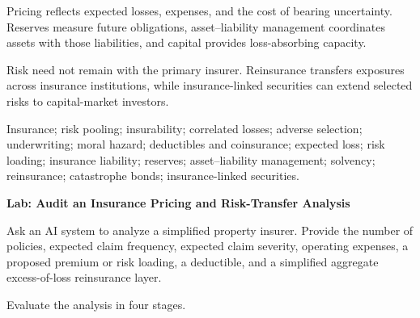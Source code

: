 Pricing reflects expected losses, expenses, and the cost of bearing uncertainty. Reserves measure future obligations, asset--liability management coordinates assets with those liabilities, and capital provides loss-absorbing capacity.

Risk need not remain with the primary insurer. Reinsurance transfers exposures across insurance institutions, while insurance-linked securities can extend selected risks to capital-market investors.




Insurance; risk pooling; insurability; correlated losses; adverse selection; underwriting; moral hazard; deductibles and coinsurance; expected loss; risk loading; insurance liability; reserves; asset--liability management; solvency; reinsurance; catastrophe bonds; insurance-linked securities.



\textbf{Lab: Audit an Insurance Pricing and Risk-Transfer Analysis}

Ask an AI system to analyze a simplified property insurer. Provide the number of policies, expected claim frequency, expected claim severity, operating expenses, a proposed premium or risk loading, a deductible, and a simplified aggregate excess-of-loss reinsurance layer.

Evaluate the analysis in four stages.

